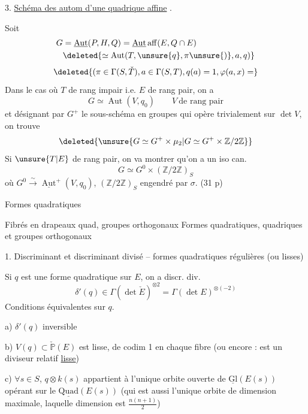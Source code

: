3. \uline{Schéma des autom d'une quadrique affine} .

Soit
\[
\begin{aligned}
G&=\underline{\operatorname{Aut}}(P,H,Q)=\underline{\operatorname{Aut}}\,\mathrm{aff}(E,Q\cap E)\\
&\deleted{\simeq\operatorname{Aut}(T,\unsure{q},\pi\unsure{)},a,q)}
\end{aligned}
\]
\[
\deleted{(\pi\in\Gamma(S,\check T),a\in\Gamma(S,T),q(a)=1,\varphi(a,x)=}
\]
Dans le cas où $T$ de rang impair i.e. $E$ de rang pair, on a
\[
G\simeq\operatorname{Aut}(V,q_0)\qquad V\ \text{de rang pair}
\]
et désignant par $G^+$ le sous-schéma en groupes qui opère trivialement sur $\det V$, on trouve
\[
\deleted{\unsure{G\simeq G^+\times\mu_2|G\simeq G^+\times\mathbb Z/2\mathbb Z}}
\]
Si $\unsure{T|E}$ de rang pair,  on va montrer qu'on a un iso can.
\[
G\simeq G^0\times(\mathbb Z/2\mathbb Z)_S
\]
où $G^0\xrightarrow{\sim}\underline{\operatorname{Aut}}^+(V,q_0)$, $(\mathbb Z/2\mathbb Z)_S$ engendré par $\sigma$.
(31 p)

Formes quadratiques

Fibrés en drapeaux quad, groupes orthogonaux
Formes quadratiques, quadriques et groupes orthogonaux

1. Discriminant et discriminant divisé -- formes quadratiques régulières (ou lisses)

Si $q$ est une forme quadratique sur $E$, on a discr. div.
\[
\delta'(q)\in\Gamma(\det\check E)^{\otimes2}=\Gamma(\det E)^{\otimes(-2)}\tag*{(1.1)}
\]
Conditions équivalentes sur $q$.

a) $\delta'(q)$ inversible

b) $V(q)\subset\check{\mathbb P}(E)$ est lisse, de codim 1 en chaque fibre (ou encore : est un diviseur relatif \uline{lisse})

c) $\forall s\in S$, $q\otimes k(s)$\deleted{\unsure{$\in$}} appartient à l'unique orbite ouverte de $\underline{\mathrm{Gl}}(E(s))$ opérant sur le  $\underline{\mathrm{Quad}}(E(s))$ (qui est aussi l'unique orbite de dimension maximale, laquelle dimension est $\frac{n(n+1)}{2}$)

